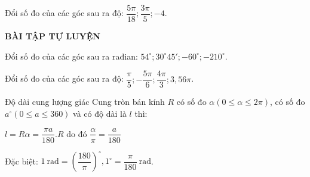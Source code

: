 \begin{vd} %
Đổi số đo của các góc sau ra độ: $\dfrac{5\pi}{18}; \dfrac{3\pi}{5}; -4$.
\end{vd}

\begin{center}
\textbf{BÀI TẬP TỰ LUYỆN}
\end{center}

\begin{bt} %
Đổi số đo của các góc sau ra rađian: $54^\circ; 30^\circ 45'; -60^\circ; -210^\circ$.
\end{bt}

\begin{bt} %
Đổi số đo của các góc sau ra độ: $\dfrac{\pi}{5}; -\dfrac{5\pi}{6}; \dfrac{4\pi}{3}; 3,56\pi$.
\end{bt}




\begin{dang}{Độ dài cung lượng giác}
Cung tròn bán kính $R$ có số đo $\alpha \left(0\le \alpha \le 2\pi \right)$, có số đo $a^\circ\left(0\le a\le 360\right)$ và có độ dài là $l$ thì:
\begin{center}
$l=R\alpha =\dfrac{\pi a}{180}.R$ do đó $\dfrac{\alpha}{\pi}=\dfrac{a}{180}$
\end{center}
Đặc biệt: $1\ \mathrm{rad}={\left(\dfrac{180}{\pi}\right)}^\circ,1^\circ=\dfrac{\pi}{180}\ \mathrm{rad}$.
\end{dang}

